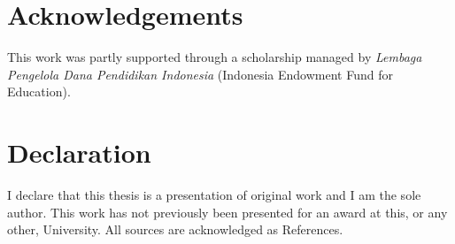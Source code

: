 \documentclass[11pt, a4paper]{report} \usepackage[titletoc]{appendix}
\begin{document}
\cleardoublepage
\listoftables
{}

\cleardoublepage
\lstlistoflistings
{}

\cleardoublepage
%
%
%
%
%
%
%

\cleardoublepage
\chapter*{Acknowledgements}
This work was partly supported through a scholarship managed by 
\emph{Lembaga Pengelola Dana Pendidikan Indonesia}
(Indonesia Endowment Fund for Education).

%
%
%

\cleardoublepage
\chapter*{Declaration}
I declare that this thesis is a presentation of original work and 
I am the sole author. This work has not previously been presented 
for an award at this, or any other, University. All sources are 
acknowledged as References.
\end{document}
